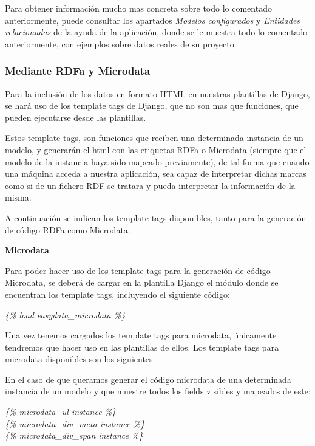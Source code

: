 Para obtener información mucho mas concreta sobre todo lo comentado
anteriormente, puede consultar los apartados \textit{Modelos configurados} y
\textit{Entidades relacionadas} de la ayuda de la aplicación, donde se le
muestra todo lo comentado anteriormente, con ejemplos sobre datos reales de su
proyecto.

\subsubsection{Mediante RDFa y Microdata}

Para la inclusión de los datos en formato HTML en nuestras plantillas de Django,
se hará uso de los template tags de Django, que no son mas que funciones, que
pueden ejecutarse desde las plantillas.

Estos template tags, son funciones que reciben una determinada instancia de un
modelo, y generarán el html con las etiquetas RDFa o Microdata (siempre que el
modelo de la instancia haya sido mapeado previamente), de tal forma que cuando
una máquina acceda a nuestra aplicación, sea capaz de interpretar dichas marcas
como si de un fichero RDF se tratara y pueda interpretar la información de la
misma.

A continuación se indican los template tags disponibles, tanto para la
generación de código RDFa como Microdata.

\begin{center}
    \textbf{Microdata}
\end{center}

Para poder hacer uso de los template tags para la generación de código
Microdata, se deberá de cargar en la plantilla Django el módulo donde se
encuentran los template tags, incluyendo el siguiente código:

\begin{center}
    \textit{\{\% load easydata\_microdata \%\}}
\end{center}

Una vez tenemos cargados los template tags para microdata, únicamente tendremos
que hacer uso en las plantillas de ellos. Los template tags para microdata
disponibles son los siguientes:

En el caso de que queramos generar el código microdata de una determinada
instancia de un modelo y que muestre todos los fields visibles y mapeados de
este:
\begin{center}
    \textit{\{\% microdata\_ul instance \%\}}\\
    \textit{\{\% microdata\_div\_meta instance \%\}}\\
    \textit{\{\% microdata\_div\_span instance \%\}}\\
\end{center}

